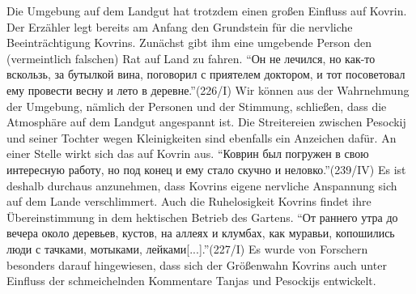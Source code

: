 \documentclass[12pt,headsepline,a4paper]{scrartcl}
\newcommand\textcyr[1]{{\fontencoding{OT2}\fontfamily{wncyr}\selectfont ``#1''}}
\begin{document}
Die Umgebung auf dem Landgut hat trotzdem einen großen Einfluss auf Kovrin. Der Erzähler legt
bereits am Anfang den Grundstein für die nervliche Beeinträchtigung Kovrins. Zunächst gibt ihm
eine umgebende Person den (vermeintlich falschen) Rat auf Land zu fahren. \textcyr{Он не лечился, но
как-то вскользь, за бутылкой вина, поговорил с приятелем доктором, и тот посоветовал ему
провести весну и лето в деревне.}(226/I) Wir können aus der Wahrnehmung der Umgebung,
nämlich der Personen und der Stimmung, schließen, dass die Atmosphäre auf dem Landgut
angespannt ist. Die Streitereien zwischen Pesockij und seiner Tochter wegen Kleinigkeiten sind
ebenfalls ein Anzeichen dafür. An einer Stelle wirkt sich das auf Kovrin aus. \textcyr{Коврин был
погружен в свою интересную работу, но под конец и ему стало скучно и неловко.}(239/IV) Es
ist deshalb durchaus anzunehmen, dass Kovrins eigene nervliche Anspannung sich auf dem Lande
verschlimmert. Auch die Ruhelosigkeit Kovrins findet ihre Übereinstimmung in dem hektischen
Betrieb des Gartens. \textcyr{От раннего утра до вечера около деревьев, кустов, на аллеях и клумбах,
как муравьи, копошились люди с тачками, мотыками, лейками[...].}(227/I) Es wurde von
Forschern besonders darauf hingewiesen, dass sich der Größenwahn Kovrins auch unter Einfluss
der schmeichelnden Kommentare Tanjas und Pesockijs entwickelt.\autocite{alekseev}
\end{document}
